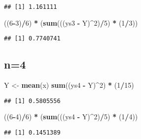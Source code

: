 \documentclass[]{article}
\newenvironment{Shaded}{\begin{snugshade}}{\end{snugshade}}
\newcommand{\KeywordTok}[1]{\textcolor[rgb]{0.13,0.29,0.53}{\textbf{#1}}}
\newcommand{\DecValTok}[1]{\textcolor[rgb]{0.00,0.00,0.81}{#1}}
\newcommand{\StringTok}[1]{\textcolor[rgb]{0.31,0.60,0.02}{#1}}
\newcommand{\OperatorTok}[1]{\textcolor[rgb]{0.81,0.36,0.00}{\textbf{#1}}}
\newcommand{\NormalTok}[1]{#1}
\begin{document}
\begin{verbatim}
## [1] 1.161111
\end{verbatim}

\begin{Shaded}
\begin{Highlighting}[]
\NormalTok{((}\DecValTok{6}\OperatorTok{-}\DecValTok{3}\NormalTok{)}\OperatorTok{/}\DecValTok{6}\NormalTok{) }\OperatorTok{*}\StringTok{ }\NormalTok{(}\KeywordTok{sum}\NormalTok{(((ys3 }\OperatorTok{-}\StringTok{ }\NormalTok{Y)}\OperatorTok{^}\DecValTok{2}\NormalTok{)}\OperatorTok{/}\DecValTok{5}\NormalTok{) }\OperatorTok{*}\StringTok{ }\NormalTok{(}\DecValTok{1}\OperatorTok{/}\DecValTok{3}\NormalTok{))}
\end{Highlighting}
\end{Shaded}

\begin{verbatim}
## [1] 0.7740741
\end{verbatim}

\subsection{n=4}\label{n4}

\begin{Shaded}
\begin{Highlighting}[]
\NormalTok{Y <-}\StringTok{ }\KeywordTok{mean}\NormalTok{(x)}
\KeywordTok{sum}\NormalTok{((ys4 }\OperatorTok{-}\StringTok{ }\NormalTok{Y)}\OperatorTok{^}\DecValTok{2}\NormalTok{) }\OperatorTok{*}\StringTok{ }\NormalTok{(}\DecValTok{1}\OperatorTok{/}\DecValTok{15}\NormalTok{)}
\end{Highlighting}
\end{Shaded}

\begin{verbatim}
## [1] 0.5805556
\end{verbatim}

\begin{Shaded}
\begin{Highlighting}[]
\NormalTok{((}\DecValTok{6}\OperatorTok{-}\DecValTok{4}\NormalTok{)}\OperatorTok{/}\DecValTok{6}\NormalTok{) }\OperatorTok{*}\StringTok{ }\NormalTok{(}\KeywordTok{sum}\NormalTok{(((ys4 }\OperatorTok{-}\StringTok{ }\NormalTok{Y)}\OperatorTok{^}\DecValTok{2}\NormalTok{)}\OperatorTok{/}\DecValTok{5}\NormalTok{) }\OperatorTok{*}\StringTok{ }\NormalTok{(}\DecValTok{1}\OperatorTok{/}\DecValTok{4}\NormalTok{))}
\end{Highlighting}
\end{Shaded}

\begin{verbatim}
## [1] 0.1451389
\end{verbatim}
\end{document}

